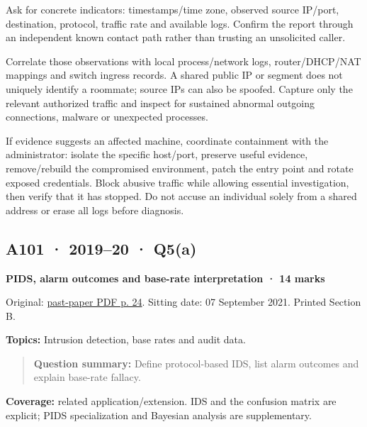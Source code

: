 \documentclass[11pt,a4paper]{article}
\begin{document}
Ask for concrete indicators: timestamps/\allowbreak{}time zone,\allowbreak{} observed source IP/\allowbreak{}port,\allowbreak{} destination,\allowbreak{} protocol,\allowbreak{} traffic rate and available logs. Confirm the report through an independent known contact path rather than trusting an unsolicited caller.


Correlate those observations with local process/\allowbreak{}network logs,\allowbreak{} router/\allowbreak{}DHCP/\allowbreak{}NAT mappings and switch ingress records. A shared public IP or segment does not uniquely identify a roommate; source IPs can also be spoofed. Capture only the relevant authorized traffic and inspect for sustained abnormal outgoing connections,\allowbreak{} malware or unexpected processes.


If evidence suggests an affected machine,\allowbreak{} coordinate containment with the administrator: isolate the specific host/\allowbreak{}port,\allowbreak{} preserve useful evidence,\allowbreak{} remove/\allowbreak{}rebuild the compromised environment,\allowbreak{} patch the entry point and rotate exposed credentials. Block abusive traffic while allowing essential investigation,\allowbreak{} then verify that it has stopped. Do not accuse an individual solely from a shared address or erase all logs before diagnosis.




\clearpage
\subsection{A101 · 2019–20 · Q5(a)}\label{a101}

\textbf{PIDS,\allowbreak{} alarm outcomes and base-rate interpretation · 14 marks}


Original: \href{../../CSE405-Security_Merged.pdf\#page=24}{past-paper PDF p. 24}. Sitting date: 07 September 2021. Printed Section B.


\textbf{Topics:} Intrusion detection,\allowbreak{} base rates and audit data.



\begin{quote}\small

\textbf{Question summary:} Define protocol-based IDS,\allowbreak{} list alarm outcomes and explain base-rate fallacy.



\end{quote}

\textbf{Coverage:} related application/\allowbreak{}extension. IDS and the confusion matrix are explicit; PIDS specialization and Bayesian analysis are supplementary.
\end{document}
